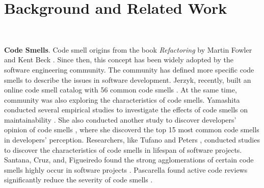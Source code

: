 \vspace*{-0.5em}

\section{Background and Related Work}~\label{sec:background}

\vspace*{-1em}


{\bf Code Smells}. Code smell origins from the book \textit{Refactoring} by
Martin Fowler and Kent Beck \cite{Fowler_Beck}. Since then, this concept has
been widely adopted by the software engineering community. The community has
defined more specific code smells
\cite{Pysmell,SQLAntipatterns,CleanCode,RefactoringWorkbook} to describe the
issues in software development. Jerzyk, recently, built an online code smell
catalog with 56 common code smells \cite{Jerzyk2023}. At the same time,
community was also exploring the characteristics of code smells. Yamashita
conducted several empirical studies to investigate the effects of code smells on
maintainability \cite{6392174} \cite{6405287}. She also conducted another study
to discover developers' opinion of code smells \cite{developersCare}, where she
discoverd the top 15 most common code smells in developers' perception.
Researchers, like Tufano \cite{whenandwhy} and Peters \cite{lifespan}, conducted
studies to discover the characteristics of code smells in lifespan of software
projects. Santana, Cruz, and, Figueiredo found the strong agglomerations of
certain code smells highly occur in software projects \cite{Santana}. Pascarella
found active code reviews significantly reduce the severity of code smells
\cite{Pascarella}.


